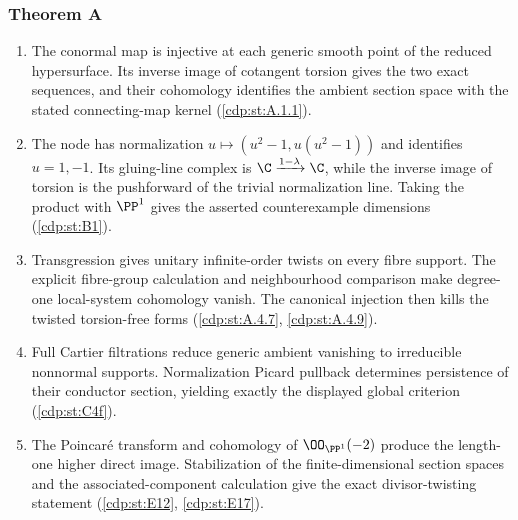 \subsubsection*{Theorem A}
\begin{enumerate}[label=\arabic*.,leftmargin=*]
\item\hypertarget{step-II-A-1}{} The conormal map is injective at
each generic smooth point of the reduced hypersurface. Its inverse
image of cotangent torsion gives the two exact sequences, and their
cohomology identifies the ambient section space with the stated
connecting-map kernel
(\hyperref[cdp:st:A.1.1]{\ref*{cdp:st:A.1.1}}).
\item\hypertarget{step-II-A-2}{} The node has normalization
$u\mapsto(u^2-1,u(u^2-1))$ and identifies $u=1,-1$. Its gluing-line
complex is $\C\xrightarrow{1-\lambda}\C$, while the inverse
image of torsion is the pushforward of the trivial normalization
line. Taking the product with $\PP^1$ gives the asserted
counterexample dimensions
(\hyperref[cdp:st:B1]{\ref*{cdp:st:B1}}).
\item\hypertarget{step-II-A-3}{} Transgression gives unitary
infinite-order twists on every fibre support. The explicit
fibre-group calculation and neighbourhood comparison make
degree-one local-system cohomology vanish. The canonical
injection then kills the twisted torsion-free forms
(\hyperref[cdp:st:A.4.7]{\ref*{cdp:st:A.4.7}},
\hyperref[cdp:st:A.4.9]{\ref*{cdp:st:A.4.9}}).
\item\hypertarget{step-II-A-4}{} Full Cartier filtrations reduce
generic ambient vanishing to irreducible nonnormal supports.
Normalization Picard pullback determines persistence of their
conductor section, yielding exactly the displayed global
criterion (\hyperref[cdp:st:C4f]{\ref*{cdp:st:C4f}}).
\item\hypertarget{step-II-A-5}{} The Poincar\'e transform and
cohomology of $\OO_{\PP^1}(-2)$ produce the length-one higher
direct image. Stabilization of the finite-dimensional section
spaces and the associated-component calculation give the exact
divisor-twisting statement
(\hyperref[cdp:st:E12]{\ref*{cdp:st:E12}},
\hyperref[cdp:st:E17]{\ref*{cdp:st:E17}}).
\end{enumerate}

\hypertarget{outline-II-B}{}

